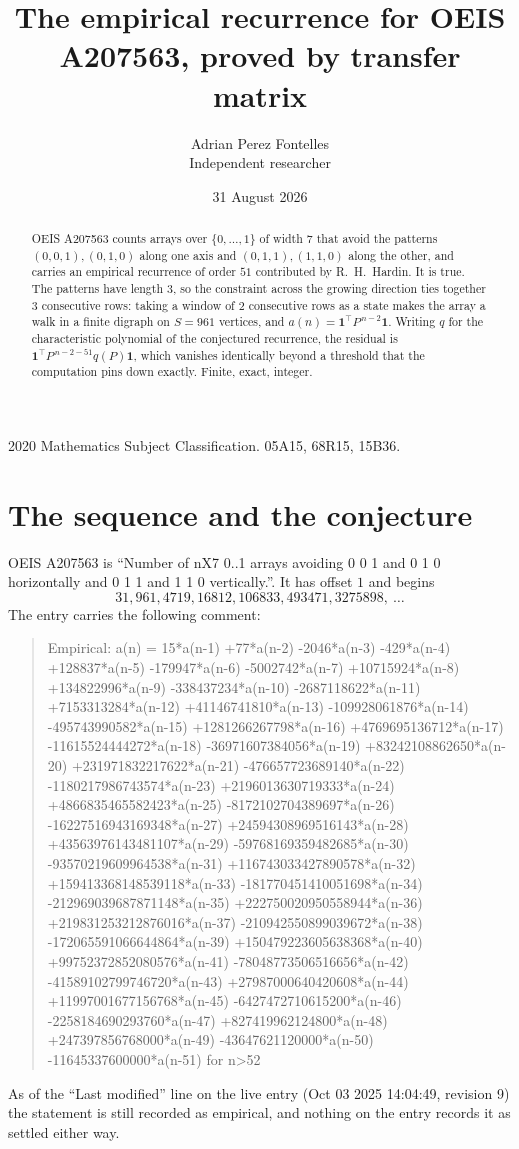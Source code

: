 \documentclass[11pt,a4paper]{article}
\title{The empirical recurrence for OEIS A207563, proved by transfer matrix}
\author{Adrian Perez Fontelles\\ \small Independent researcher}
\date{31 August 2026}
\theoremstyle{plain}
\theoremstyle{definition}
\begin{document}
\maketitle

\begin{abstract}
OEIS A207563 counts arrays over $\{0,\dots,1\}$ of width $7$ that avoid the patterns
$(0,0,1), (0,1,0)$ along one axis and $(0,1,1), (1,1,0)$ along the other, and carries an empirical recurrence of
order $51$ contributed by R.~H.~Hardin. It is true. The patterns have length $3$, so
the constraint across the growing direction ties together $3$ consecutive rows: taking a
window of $2$ consecutive rows as a state makes the array a walk in a finite digraph
on $S=961$ vertices, and $a(n)=\mathbf{1}^{\!\top}P^{\,n-2}\mathbf{1}$. Writing $q$
for the characteristic polynomial of the conjectured recurrence, the residual is
$\mathbf{1}^{\!\top}P^{\,n-2-51}q(P)\mathbf{1}$, which vanishes identically
beyond a threshold that the computation pins down exactly. Finite, exact, integer.
\end{abstract}

\noindent\small 2020 Mathematics Subject Classification. 05A15, 68R15, 15B36.\normalsize

\section{The sequence and the conjecture}

OEIS A207563 is ``Number of nX7 0..1 arrays avoiding 0 0 1 and 0 1 0 horizontally and 0 1 1 and 1 1 0 vertically.''. It has offset
$1$ and begins
\[
31, 961, 4719, 16812, 106833, 493471, 3275898,\ \dots
\]
The entry carries the following comment:
\begin{quote}\small
Empirical: a(n) = 15*a(n-1) +77*a(n-2) -2046*a(n-3) -429*a(n-4) +128837*a(n-5) -179947*a(n-6) -5002742*a(n-7) +10715924*a(n-8) +134822996*a(n-9) -338437234*a(n-10) -2687118622*a(n-11) +7153313284*a(n-12) +41146741810*a(n-13) -109928061876*a(n-14) -495743990582*a(n-15) +1281266267798*a(n-16) +4769695136712*a(n-17) -11615524444272*a(n-18) -36971607384056*a(n-19) +83242108862650*a(n-20) +231971832217622*a(n-21) -476657723689140*a(n-22) -1180217986743574*a(n-23) +2196013630719333*a(n-24) +4866835465582423*a(n-25) -8172102704389697*a(n-26) -16227516943169348*a(n-27) +24594308969516143*a(n-28) +43563976143481107*a(n-29) -59768169359482685*a(n-30) -93570219609964538*a(n-31) +116743033427890578*a(n-32) +159413368148539118*a(n-33) -181770451410051698*a(n-34) -212969039687871148*a(n-35) +222750020950558944*a(n-36) +219831253212876016*a(n-37) -210942550899039672*a(n-38) -172065591066644864*a(n-39) +150479223605638368*a(n-40) +99752372852080576*a(n-41) -78048773506516656*a(n-42) -41589102799746720*a(n-43) +27987000640420608*a(n-44) +11997001677156768*a(n-45) -6427472710615200*a(n-46) -2258184690293760*a(n-47) +827419962124800*a(n-48) +247397856768000*a(n-49) -43647621120000*a(n-50) -11645337600000*a(n-51) for n>52
\end{quote}
As of the ``Last modified'' line on the live entry (Oct 03 2025 14:04:49, revision
9) the statement is still recorded as empirical, and nothing on the entry
records it as settled either way.
\end{document}
